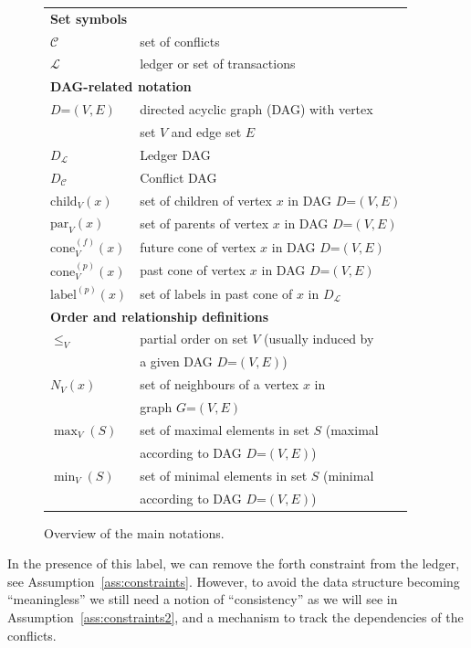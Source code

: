 \documentclass[11pt]{article}
\newcommand{\lab}{\mathrm{label}}
\newcommand{\conflictset}{\mathcal{C}}
\newcommand{\ledger}{\mathcal{L}}
\newcommand{\LedgerDAG}{D_{\ledger}}
\newcommand{\ConflictDAG}{D_{\conflictset}}
\newcommand{\cone}[3]{\mathrm{cone}_{#2}^{(#1)}\left(#3\right)}
\newcommand{\parent}[2]{\mathrm{par}_{#1}\left(#2\right)}
\newcommand{\child}[2]{\mathrm{child}_{#1}\left(#2\right)}
\newcommand{\maximal}[2]{\max_{#1}\left(#2\right)}
\newcommand{\minimal}[2]{\min_{#1}\left(#2\right)}
\theoremstyle{plain}
\theoremstyle{definition}
\numberwithin{definition}{section}
\numberwithin{lemma}{section}
\numberwithin{ass}{section}
\numberwithin{remark}{section}
\numberwithin{example}{section}
\numberwithin{proposition}{section}
\numberwithin{theorem}{section}
\begin{document}
\begin{figure}[t!]
\begin{tabular}{ll}
    \multicolumn{2}{l}{\textbf{Set symbols}}\\
    $\conflictset$ &  set of conflicts \\
    $\ledger$ &  ledger or set of transactions  \\
    \multicolumn{2}{l}{\textbf{DAG-related notation}}\\
    $D$=$(V,E)$  &  directed acyclic graph (DAG) with vertex \\
    & set $V$ and edge set $E$ \\
    $\LedgerDAG$ & Ledger DAG  \\
    $\ConflictDAG$ & Conflict DAG  \\
    $\child{V}{x}$   &  set of children of vertex $x$ in DAG $D$=$(V,E)$ \\
    $\parent{V}{x}$ &  set of parents of vertex $x$ in DAG $D$=$(V,E)$ \\
    $\cone{f}{V}{x}$    & future cone of vertex $x$ in DAG $D$=$(V,E)$ \\
    $\cone{p}{V}{x}$  &  past cone of vertex $x$ in DAG $D$=$(V,E)$ \\
    $\lab^{(p)}(x)$ & set of labels in past cone of $x$ in $\LedgerDAG$\\
    \multicolumn{2}{l}{\textbf{Order and relationship definitions}}\\ 
    $\le_V$ &  partial order on set $V$ (usually induced by\\
    & a given DAG $D$=$(V,E)$) \\
    $N_V(x)$ &  set of neighbours of a vertex $x$ in \\
    & graph $G$=$(V,E)$ \\
    $\maximal{V}{S}$ &  set of maximal elements in set $S$ (maximal \\
    & according to DAG $D$=$(V,E)$) \\
    $\minimal{V}{S}$ &  set of minimal elements in set $S$ (minimal \\
    & according to DAG $D$=$(V,E)$) \\
\end{tabular}
\caption{Overview of the main notations.}
\label{fig:notations}
\end{figure}

In the presence of this label, we can remove the forth constraint from the ledger, see Assumption~\ref{ass:constraints}. However, to avoid the data structure becoming ``meaningless'' we still need a notion of ``consistency'' as we will see in Assumption~\ref{ass:constraints2}, and a mechanism  to track the dependencies of the conflicts. 
\end{document}
